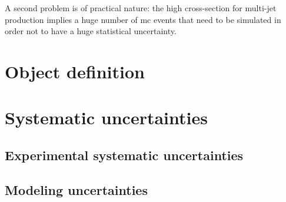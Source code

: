 A second problem is of practical nature: the high cross-section for multi-jet production implies a huge number of \gls{mc} events that need to be simulated in order not to have a huge statistical uncertainty. 


\section{Object definition}
\label{sec:common_obj_def}

\section{Systematic uncertainties}
\label{sec:common_syst}

\subsection{Experimental systematic uncertainties}

\subsection{Modeling uncertainties} 

